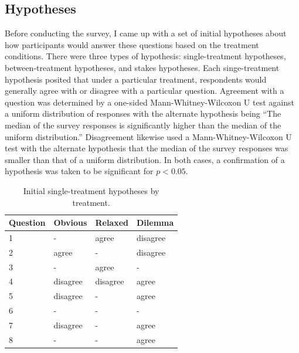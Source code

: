 \subsection{Hypotheses}

Before conducting the survey, I came up with a set of initial hypotheses about how participants would answer these questions based on the treatment conditions.
%
There were three types of hypothesis: single-treatment hypotheses, between-treatment hypotheses, and stakes hypotheses.
%
Each singe-treatment hypothesis posited that under a particular treatment, respondents would generally agree with or disagree with a particular question.
%
Agreement with a question was determined by a one-sided Mann-Whitney-Wilcoxon U test \citep{Mann1947,Wilcoxon1945} against a uniform distribution of responses with the alternate hypothesis being ``The median of the survey responses is significantly higher than the median of the uniform distribution.''
%
Disagreement likewise used a Mann-Whitney-Wilcoxon U test with the alternate hypothesis that the median of the survey responses was smaller than that of a uniform distribution.
%
In both cases, a confirmation of a hypothesis was taken to be significant for $p < 0.05$.


\begin{table}
\bgroup
\def\arraystretch{1.1}
\begin{tabular}{l | l | l | l |}
Question & Obvious & Relaxed & Dilemma \\
\hline
1 &     -    &  agree   & disagree \\
\hline
2 &  agree   &     -    & disagree \\
\hline
3 &     -    &  agree   &     -    \\
\hline           
4 & disagree & disagree &  agree   \\
\hline
5 & disagree &     -    &  agree   \\
\hline
6 &     -    &     -    &     -    \\
\hline
7 & disagree &     -    &  agree   \\
\hline
8 &     -    &     -    &  agree   \\
\hline
\end{tabular}
\egroup
  \caption{Initial single-treatment hypotheses by treatment.}
  \label{tab:single-treatment}
\end{table}


